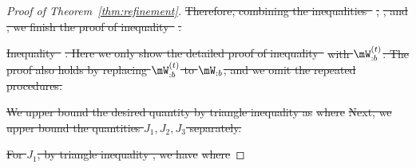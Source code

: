 \documentclass[lettersize,onecolumn,journal]{IEEEtran}
\theoremstyle{definition}
\theoremstyle{definition}
\newcommand{\of}[1]{\left(#1\right)}
\providecommand{\DIFdeltex}[1]{{\protect\color{red}\sout{#1}}}                      %
\providecommand{\DIFdel}[1]{\texorpdfstring{\DIFdeltex{#1}}{}} %
\begin{document}
\begin{proof}[Proof of Theorem~\ref{thm:refinement}]
\DIFdel{Therefore, combining the inequalities~}%
\DIFdel{, }%
\DIFdel{, and }%
\DIFdel{, we finish the proof of inequality~}%
\DIFdel{.
    }%

\DIFdel{Inequality~}%
\DIFdel{. Here we only show the detailed proof of inequality~}%
\DIFdel{with $\mW_{:b}^{(t)}$. The proof also holds by replacing $\mW_{:b}^{(t)}$ to $\mW_{:b}$, and we omit the repeated procedures.
    }%

\DIFdel{We upper bound the desired quantity by triangle inequality as
    }%
\DIFdel{where 
    }%
\DIFdel{Next, we upper bound the quantities $J_1, J_2, J_3$ separately. 
}%

\DIFdel{For $J_1$, by triangle inequality 
    , we have 
    }%
\DIFdel{where 
    }%


\end{proof}
\end{document}
